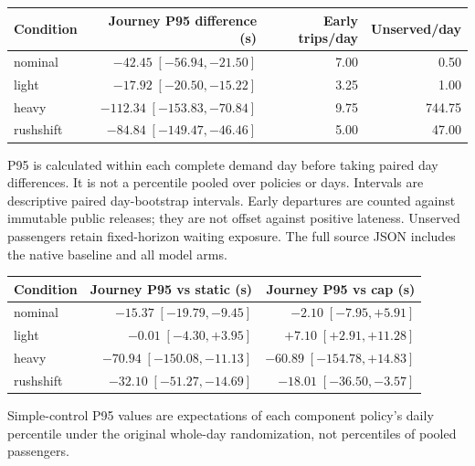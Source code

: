 \begin{center}\small
\begin{tabular}{lrrr}\toprule
Condition & Journey P95 difference (s) & Early trips/day & Unserved/day \\ \midrule
nominal & $-42.45\;[-56.94,-21.50]$ & 7.00 & 0.50 \\
light & $-17.92\;[-20.50,-15.22]$ & 3.25 & 1.00 \\
heavy & $-112.34\;[-153.83,-70.84]$ & 9.75 & 744.75 \\
rushshift & $-84.84\;[-149.47,-46.46]$ & 5.00 & 47.00 \\
\bottomrule\end{tabular}\end{center}
P95 is calculated within each complete demand day before taking paired day differences. It is not a percentile pooled over policies or days. Intervals are descriptive paired day-bootstrap intervals. Early departures are counted against immutable public releases; they are not offset against positive lateness. Unserved passengers retain fixed-horizon waiting exposure. The full source JSON includes the native baseline and all model arms.
\begin{center}\small
\begin{tabular}{lrr}\toprule
Condition & Journey P95 vs static (s) & Journey P95 vs cap (s) \\ \midrule
nominal & $-15.37\;[-19.79,-9.45]$ & $-2.10\;[-7.95,+5.91]$ \\
light & $-0.01\;[-4.30,+3.95]$ & $+7.10\;[+2.91,+11.28]$ \\
heavy & $-70.94\;[-150.08,-11.13]$ & $-60.89\;[-154.78,+14.83]$ \\
rushshift & $-32.10\;[-51.27,-14.69]$ & $-18.01\;[-36.50,-3.57]$ \\
\bottomrule\end{tabular}\end{center}
Simple-control P95 values are expectations of each component policy's daily percentile under the original whole-day randomization, not percentiles of pooled passengers.
